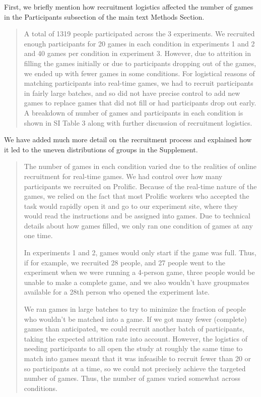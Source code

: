 \documentclass{stanfordletter}
\newcommand{\revised}[1]{\begin{quote}	#1 \end{quote}}
\begin{document}
\begin{letter}{}
          First, we briefly mention how recruitment logistics affected the number of games in the Participants subsection of the main text Methods Section. 
          
          \revised{A total of 1319 people participated across the 3 experiments. We recruited enough participants for 20 games in each condition in experiments 1 and 2 and 40 games per condition in experiment 3. However, due to attrition in filling the games initially or due to participants dropping out of the games, we ended up with fewer games in some conditions. For logistical reasons of matching participants into real-time games, we had to recruit participants in fairly large batches, and so did not have precise control to add new games to replace games that did not fill or had participants drop out early.  A breakdown of number of games and participants in each condition is shown in SI Table 3 along with further discussion of recruitment logistics. }
          
	We have added much more detail on the recruitment process and explained how it led to the uneven distributions of groups in the Supplement.     
	
          \revised{The number of games in each condition varied due to the realities of online recruitment for real-time games. We had control over how many participants we recruited on Prolific. Because of the real-time nature of the games, we relied on the fact that most Prolific workers who accepted the task would rapidly open it and go to our experiment site, where they would read the instructions and be assigned into games. Due to technical details about how games filled, we only ran one condition of games at any one time.
          	
          	In experiments 1 and 2, games would only start if the game was full. Thus, if for example, we recruited 28 people, and 27 people went to the experiment when we were running a 4-person game, three people would be unable to make a complete game, and we also wouldn't have groupmates available for a 28th person who opened the experiment late. 
          	
          	We ran games in large batches to try to minimize the fraction of people who wouldn't be matched into a game. If we got many fewer (complete) games than anticipated, we could recruit another batch of participants, taking the expected attrition rate into account. However, the logistics of needing participants to all open the study at roughly the same time to match into games meant that it was infeasible to recruit fewer than 20 or so participants at a time, so we could not precisely achieve the targeted number of games. Thus, the number of games varied somewhat across conditions. 
          	
}
\end{letter}
\end{document}
